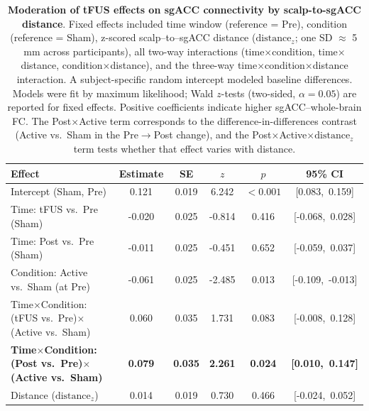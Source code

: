 \begin{table}[t]
    \centering
    \scriptsize
    \vspace{1ex}
    \caption{\textbf{Moderation of tFUS effects on sgACC connectivity by scalp-to-sgACC distance}. 
Fixed effects included time window (reference = Pre), condition (reference = Sham), z-scored scalp–to–sgACC distance ($\mathrm{distance}_z$; one SD $\approx$ 5\,mm across participants), all two-way interactions (time$\times$condition, time$\times$distance, condition$\times$distance), and the three-way time$\times$condition$\times$distance interaction. A subject-specific random intercept modeled baseline differences. Models were fit by maximum likelihood; Wald $z$-tests (two-sided, $\alpha=0.05$) are reported for fixed effects. Positive coefficients indicate higher sgACC–whole-brain FC. The Post$\times$Active term corresponds to the difference-in-differences contrast (Active vs.\ Sham in the Pre$\rightarrow$Post change), and the Post$\times$Active$\times\mathrm{distance}_z$ term tests whether that effect varies with distance.}
    \label{tab:distance_moderation_mixedlm}
    \setlength{\tabcolsep}{8pt}
    \begin{tabular}{lccccc}
    \toprule
    \textbf{Effect} & \textbf{Estimate} & \textbf{SE} & \textbf{$z$} & \textbf{$p$} & \textbf{95\% CI} \\
    \midrule
    Intercept (Sham, Pre)                                             & 0.121 & 0.019 &  6.242 & $<\!0.001$ & [0.083,\ 0.159] \\
    Time: tFUS vs.\ Pre (Sham)                                       &-0.020 & 0.025 & -0.814 & 0.416      & [-0.068,\ 0.028] \\
    Time: Post vs.\ Pre (Sham)                                       &-0.011 & 0.025 & -0.451 & 0.652      & [-0.059,\ 0.037] \\
    Condition: Active vs.\ Sham (at Pre)                             &-0.061 & 0.025 & -2.485 & 0.013      & [-0.109,\ -0.013] \\
    Time$\times$Condition: (tFUS vs.\ Pre)$\times$(Active vs.\ Sham) & 0.060 & 0.035 &  1.731 & 0.083      & [-0.008,\ 0.128] \\
    \textbf{Time$\times$Condition: (Post vs.\ Pre)$\times$(Active vs.\ Sham)} & \textbf{0.079} & \textbf{0.035} &  \textbf{2.261} & \textbf{0.024}      & \textbf{[0.010,\ 0.147]} \\
    \addlinespace[3pt]
    Distance ($\mathrm{distance}_z$)                                  & 0.014 & 0.019 &  0.730 & 0.466      & [-0.024,\ 0.052] \\

\end{tabular}
\end{table}
